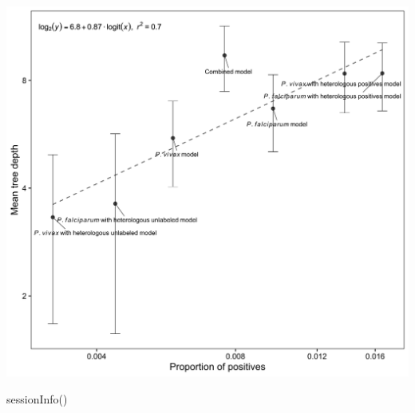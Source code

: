 \documentclass[
  11pt,
  oneside]{book}
\newenvironment{Shaded}{\begin{snugshade}}{\end{snugshade}}
\newcommand{\FunctionTok}[1]{\textcolor[rgb]{0.00,0.00,0.00}{#1}}
\newcommand{\NormalTok}[1]{#1}
\begin{document}
\begin{center}\includegraphics[width=1\linewidth]{./figures/Supplementary Fig 7} \end{center}

\begin{Shaded}
\begin{Highlighting}[]
\FunctionTok{sessionInfo}\NormalTok{()}
\end{Highlighting}
\end{Shaded}
\end{document}
